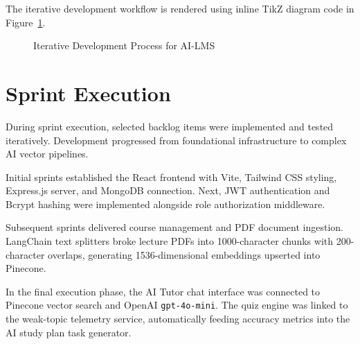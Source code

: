 The iterative development workflow is rendered using inline TikZ diagram code in Figure~\ref{fig:agileprocess}.

\begin{figure}[H]
\centering
{}
\caption{Iterative Development Process for AI-LMS}
\label{fig:agileprocess}
\end{figure}

\section{Sprint Execution}

During sprint execution, selected backlog items were implemented and tested iteratively. Development progressed from foundational infrastructure to complex AI vector pipelines.

Initial sprints established the React frontend with Vite, Tailwind CSS styling, Express.js server, and MongoDB connection. Next, JWT authentication and Bcrypt hashing were implemented alongside role authorization middleware.

Subsequent sprints delivered course management and PDF document ingestion. LangChain text splitters broke lecture PDFs into 1000-character chunks with 200-character overlaps, generating 1536-dimensional embeddings upserted into Pinecone.

In the final execution phase, the AI Tutor chat interface was connected to Pinecone vector search and OpenAI \texttt{gpt-4o-mini}. The quiz engine was linked to the weak-topic telemetry service, automatically feeding accuracy metrics into the AI study plan task generator.

